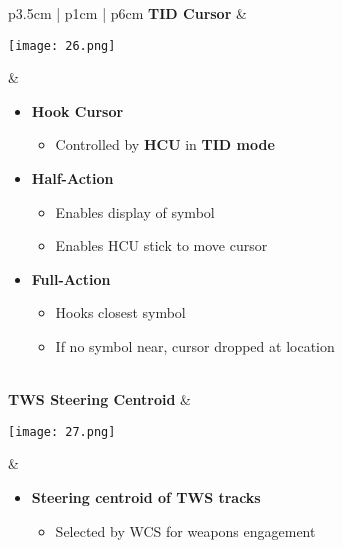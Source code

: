 \documentclass[8pt,usenames,dvipsnames,twoside]{article}
\begin{document}
\begin{center}
\begin{longtable}{p{3.5cm} | p{1cm} |  p{6cm}}
				\midrule
				\textbf{TID Cursor} &
				\begin{minipage}[t]{\linewidth}
					\vspace{-7pt}
					\centering
					\texttt{[image: 26.png]}
				\end{minipage} &  
				\begin{minipage}[t]{\linewidth}
					\vspace{-7pt}
					\begin{itemize}
						\item \textbf{Hook Cursor}
						\begin{itemize}
							\item Controlled by \textbf{HCU} in \textbf{TID mode}
						\end{itemize}
						\item \textbf{Half-Action}
						\begin{itemize}
							\item Enables display of symbol
							\item Enables HCU stick to move cursor
						\end{itemize}
						\item \textbf{Full-Action}
						\begin{itemize}
							\item Hooks closest symbol
							\item If no symbol near, cursor dropped at location
						\end{itemize}
					\end{itemize}
				\end{minipage} \\
				\midrule
				\textbf{TWS Steering Centroid} & 
				\begin{minipage}[t]{\linewidth}
					\vspace{-7pt}
					\centering
					\texttt{[image: 27.png]}
				\end{minipage} &  
				\begin{minipage}[t]{\linewidth}
					\vspace{-7pt}
					\begin{itemize}
						\item \textbf{Steering centroid of TWS tracks}
						\begin{itemize}
							\item Selected by WCS for weapons engagement
						\end{itemize}
					\end{itemize}
				\end{minipage} \\

\end{longtable}
\end{center}
\end{document}
